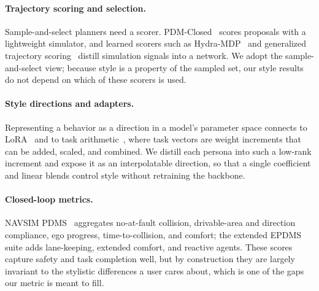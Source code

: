 \paragraph{Trajectory scoring and selection.}
Sample-and-select planners need a scorer. PDM-Closed~\cite{pdmclosed} scores
proposals with a lightweight simulator, and learned scorers such as
Hydra-MDP~\cite{hydramdp} and generalized trajectory scoring~\cite{gtrs,wote} distill
simulation signals into a network. We adopt the sample-and-select view; because style
is a property of the sampled set, our style results do not depend on which of these
scorers is used.

\paragraph{Style directions and adapters.}
Representing a behavior as a direction in a model's parameter space connects to
LoRA~\cite{lora} and to task arithmetic~\cite{taskvector}, where task vectors are
weight increments that can be added, scaled, and combined. We distill each persona
into such a low-rank increment and expose it as an interpolatable direction, so that a
single coefficient and linear blends control style without retraining the backbone.

\paragraph{Closed-loop metrics.}
NAVSIM PDMS~\cite{navsim,pdmclosed} aggregates no-at-fault collision, drivable-area
and direction compliance, ego progress, time-to-collision, and comfort; the extended
EPDMS suite adds lane-keeping, extended comfort, and reactive agents. These scores
capture safety and task completion well, but by construction they are largely
invariant to the stylistic differences a user cares about, which is one of the gaps
our metric is meant to fill.
